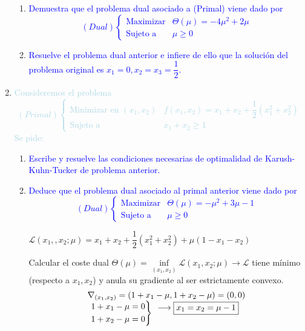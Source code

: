 \documentclass[12pt]{article}
\newcommand{\lb}[1]{\textcolor{lightblue}{#1}}
\newcommand{\db}[1]{\textcolor{blue}{#1}}
\begin{document}
\begin{enumerate}[label=\color{red}\arabic*.]
\begin{enumerate}[label=\color{red}\alph*)]
    	\item \db{Demuestra que el problema dual asociado a (Primal) viene dado por \[ (Dual)\begin{cases}
    	\text{Maximizar} & \Theta(\mu)=-4\mu^2+2\mu\\
    	\text{Sujeto a }& \mu\ge0
    	\end{cases} \]}
    	
    	\item \db{Resuelve el problema dual anterior e infiere de ello que la solución del problema original es $x_1=0,x_2=x_3=\dfrac{1}{2}$.}
    \end{enumerate}
    \item \lb{Consideremos el problema \[ (Primal)\begin{cases}
    \text{Minimizar en }(x_1,x_2) & f(x_1,x_2)=x_1+x_2+\dfrac{1}{2}(x_1^2+x_2^2)\\
    \text{Sujeto a} & x_1+x_2\ge1
    \end{cases} \]Se pide:}
    \begin{enumerate}[label=\color{red}\alph*)]
    	\item \db{Escribe y resuelve las condiciones necesarias de optimalidad de Karush-Kuhn-Tucker de problema anterior.}
    	
    	\item \db{Deduce que el problema dual asociado al primal anterior viene dado por \[ (Dual)\begin{cases}
    	\text{Maximizar} & \Theta(\mu)=-\mu^2+3\mu-1\\
    	\text{Sujeto a }& \mu\ge0
    	\end{cases} \]}
    	
    	$\mathcal{L}(x_1,,x_2;\mu)=x_1+x_2+\dfrac{1}{2}(x_1^2+x_2^2)+\mu(1-x_1-x_2)$
    	
    	Calcular el coste dual $\Theta(\mu)=\underset{(x_1,x_2)}{\inf}\mathcal{L}(x_1,x_2;\mu)\longrightarrow\mathcal{L}$ tiene mínimo (respecto a $x_1,x_2$) y anula su gradiente al ser estrictamente convexo. \[ \begin{array}{c}
    	\nabla_{(x_1,x_2)}=(1+x_1-\mu, 1+x_2-\mu)=(0,0) \\
    	\begin{rcases}
    	1+x_1-\mu=0\\
    	1+x_2-\mu=0
    	\end{rcases}\begin{array}{l}
    	\longrightarrow \boxed{x_1=x_2=\mu-1}\\
    	\\
    	\end{array}
    	\end{array}\]
    	

\end{enumerate}
\end{enumerate}
\end{document}
